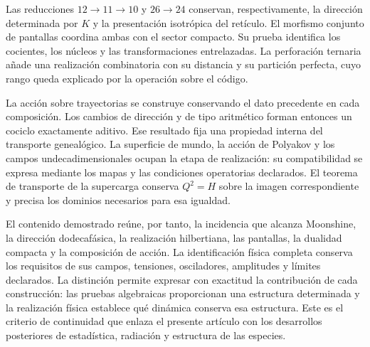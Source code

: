 Las reducciones \(12\to11\to10\) y \(26\to24\) conservan,
respectivamente, la dirección determinada por \(K\) y la
presentación isotrópica del retículo. El morfismo conjunto de pantallas
coordina ambas con el sector compacto. Su prueba identifica los
cocientes, los núcleos y las transformaciones entrelazadas. La
perforación ternaria añade una realización combinatoria con su
distancia y su partición perfecta, cuyo rango queda explicado por
la operación sobre el código.

La acción sobre trayectorias se construye conservando el dato
precedente en cada composición. Los cambios de dirección y de tipo
aritmético forman entonces un cociclo exactamente aditivo. Ese
resultado fija una propiedad interna del transporte genealógico.
La superficie de mundo, la acción de Polyakov y los campos
undecadimensionales ocupan la etapa de realización: su compatibilidad
se expresa mediante los mapas y las condiciones operatorias
declarados. El teorema de transporte de la supercarga conserva
\(Q^2=H\) sobre la imagen correspondiente y precisa los dominios
necesarios para esa igualdad.

El contenido demostrado reúne, por tanto, la incidencia que alcanza
Moonshine, la dirección dodecafásica, la realización hilbertiana,
las pantallas, la dualidad compacta y la composición de acción.
La identificación física completa conserva los requisitos de sus
campos, tensiones, osciladores, amplitudes y límites declarados.
La distinción permite expresar con exactitud la contribución de cada
construcción: las pruebas algebraicas proporcionan una estructura
determinada y la realización física establece qué dinámica conserva
esa estructura. Este es el criterio de continuidad que enlaza el
presente artículo con los desarrollos posteriores de estadística,
radiación y estructura de las especies.
